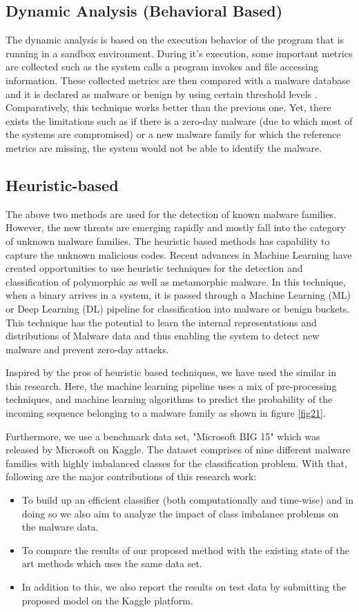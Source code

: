 \documentclass[conference]{IEEEtran}
\begin{document}
\subsection{Dynamic Analysis (Behavioral Based)}
The dynamic analysis is based on the execution behavior of the program that is running in a sandbox environment. During it's execution, some important metrics are collected such as the system calls a program invokes and file accessing information. These collected metrics are then compared with a malware database and it is declared as malware or benign by using certain threshold levels \cite{b26}. Comparatively, this technique works better than the previous one. Yet, there exists the limitations such as if there is a zero-day malware (due to which most of the systems are compromised) or a new malware family for which the reference metrics are missing, the system would not be able to identify the malware.
\subsection{Heuristic-based}
The above two methods are used for the detection of known malware families. However, the new threats are emerging rapidly and mostly fall into the category of unknown malware families. The heuristic based methods has capability to capture the unknown malicious codes. Recent advances in Machine Learning have created opportunities to use heuristic techniques for the detection and classification of polymorphic as well as metamorphic malware. In this technique, when a binary arrives in a system, it is passed through a Machine Learning (ML) or Deep Learning (DL) pipeline for classification into malware or benign \cite{b27} buckets. This technique has the potential to learn the internal representations and distributions of Malware data and thus enabling the system to detect new malware and prevent zero-day attacks. 

Inspired by the pros of heuristic based techniques, we have used the similar in this research. Here, the machine learning pipeline uses a mix of pre-processing techniques, and machine learning algorithms to predict the probability of the incoming sequence belonging to a malware family as shown in figure \ref{fig21}.

Furthermore,  we use a benchmark data set, "Microsoft BIG 15" which was released by Microsoft on Kaggle\cite{b24}. The dataset comprises of nine different malware families with highly imbalanced classes for the classification problem. With that, following are the major contributions of this research work:
\begin{itemize}
    \item To build up an efficient classifier (both computationally and time-wise) and in doing so we also aim to analyze the impact of class imbalance problems on the malware data.
    \item To compare the results of our proposed method with the existing state of the art methods which uses the same data set.
    \item In addition to this, we also report the results on test data by submitting the proposed model on the Kaggle \cite{b24} platform.
\end{itemize}
\end{document}
